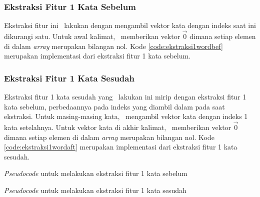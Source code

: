 \subsubsection{Ekstraksi Fitur 1 Kata Sebelum}
Ekstraksi fitur ini \saya~lakukan dengan mengambil vektor kata dengan indeks saat ini dikurangi satu. Untuk awal kalimat, \saya~memberikan vektor $ \vec{0} $ dimana setiap elemen di dalam \textit{array} merupakan bilangan nol. Kode \ref{code:ekstraksi1wordbef} merupakan implementasi dari ekstraksi fitur 1 kata sebelum.

\subsubsection{Ekstraksi Fitur 1 Kata Sesudah}
Ekstraksi fitur 1 kata sesudah yang \saya~lakukan ini mirip dengan ekstraksi fitur 1 kata sebelum, perbedaannya pada indeks yang diambil dalam pada saat ekstraksi. Untuk masing-masing kata, \saya~mengambil vektor kata dengan indeks 1 kata setelahnya. Untuk vektor kata di akhir kalimat, \saya~memberikan vektor $ \vec{0} $ dimana setiap elemen di dalam \textit{array} merupakan bilangan nol. Kode \ref{code:ekstraksi1wordaft} merupakan implementasi dari ekstraksi fitur 1 kata sesudah.

\begin{kode}	
	
	\SetAlgoLined

	\BlankLine
	
	\caption{\textit{Pseudocode} untuk melakukan ekstraksi fitur 1 kata sebelum}
	\label{code:ekstraksi1wordbef}	
\end{kode}

\begin{kode}
	
	
	\SetAlgoLined
	
	\BlankLine	
	\caption{\textit{Pseudocode} untuk melakukan ekstraksi fitur 1 kata sesudah}
	\label{code:ekstraksi1wordaft}
\end{kode}

